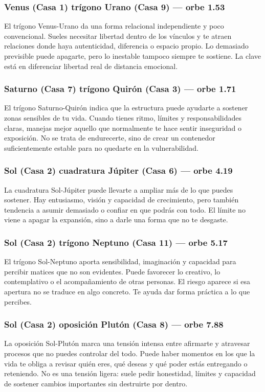 \documentclass[11pt,a4paper]{article}\usepackage[utf8]{inputenc}
\begin{document}
\subsubsection*{Venus (Casa 1) trígono Urano (Casa 9) --- orbe 1.53\textdegree}
El trígono Venus-Urano da una forma relacional independiente y poco convencional. Sueles necesitar libertad dentro de los vínculos y te atraen relaciones donde haya autenticidad, diferencia o espacio propio. Lo demasiado previsible puede apagarte, pero lo inestable tampoco siempre te sostiene. La clave está en diferenciar libertad real de distancia emocional.

\subsubsection*{Saturno (Casa 7) trígono Quirón (Casa 3) --- orbe 1.71\textdegree}
El trígono Saturno-Quirón indica que la estructura puede ayudarte a sostener zonas sensibles de tu vida. Cuando tienes ritmo, límites y responsabilidades claras, manejas mejor aquello que normalmente te hace sentir inseguridad o exposición. No se trata de endurecerte, sino de crear un contenedor suficientemente estable para no quedarte en la vulnerabilidad.

\subsubsection*{Sol (Casa 2) cuadratura Júpiter (Casa 6) --- orbe 4.19\textdegree}
La cuadratura Sol-Júpiter puede llevarte a ampliar más de lo que puedes sostener. Hay entusiasmo, visión y capacidad de crecimiento, pero también tendencia a asumir demasiado o confiar en que podrás con todo. El límite no viene a apagar la expansión, sino a darle una forma que no te desgaste.

\subsubsection*{Sol (Casa 2) trígono Neptuno (Casa 11) --- orbe 5.17\textdegree}
El trígono Sol-Neptuno aporta sensibilidad, imaginación y capacidad para percibir matices que no son evidentes. Puede favorecer lo creativo, lo contemplativo o el acompañamiento de otras personas. El riesgo aparece si esa apertura no se traduce en algo concreto. Te ayuda dar forma práctica a lo que percibes.

\subsubsection*{Sol (Casa 2) oposición Plutón (Casa 8) --- orbe 7.88\textdegree}
La oposición Sol-Plutón marca una tensión intensa entre afirmarte y atravesar procesos que no puedes controlar del todo. Puede haber momentos en los que la vida te obliga a revisar quién eres, qué deseas y qué poder estás entregando o reteniendo. No es una tensión ligera: suele pedir honestidad, límites y capacidad de sostener cambios importantes sin destruirte por dentro.
\end{document}
